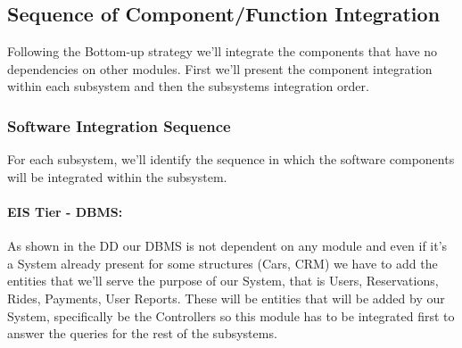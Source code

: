 \documentclass[a4paper]{article}
\begin{document}
\subsection{Sequence of Component/Function Integration}
Following the Bottom-up strategy we'll integrate the components that have no dependencies on other modules. First we'll present the component integration within each subsystem and then the subsystems integration order.
\subsubsection{Software Integration Sequence}
For each subsystem, we'll identify the sequence in which the software components will be integrated within the subsystem.
\paragraph{EIS Tier - DBMS:}
As shown in the DD our DBMS is not dependent on any module and even if it's a System already present for some structures (Cars, CRM) we have to add the entities that we'll serve the purpose of our System, that is Users, Reservations, Rides, Payments, User Reports. These will be entities that will be added by our System, specifically be the Controllers so this module has to be integrated first to answer the queries for the rest of the subsystems.
\end{document}
